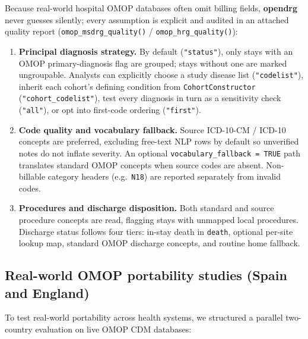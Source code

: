 \documentclass[fleqn,10pt]{IOMEDArticle}
\begin{document}
{\sloppy Because real-world hospital OMOP databases often omit billing fields, \textbf{opendrg} never guesses silently; every assumption is explicit and audited in an attached quality report (\texttt{omop\_\allowbreak msdrg\_\allowbreak quality()} / \texttt{omop\_\allowbreak hrg\_\allowbreak quality()}):
\begin{enumerate}[leftmargin=*,nosep]
    \item \textbf{Principal diagnosis strategy.} By default (\texttt{"status"}), only stays with an OMOP primary-diagnosis flag are grouped; stays without one are marked ungroupable. Analysts can explicitly choose a study disease list (\texttt{"codelist"}), inherit each cohort's defining condition from \texttt{CohortConstructor} (\texttt{"cohort\_\allowbreak codelist"}), test every diagnosis in turn as a sensitivity check (\texttt{"all"}), or opt into first-code ordering (\texttt{"first"}).
    \item \textbf{Code quality and vocabulary fallback.} Source ICD-10-CM / ICD-10 concepts are preferred, excluding free-text NLP rows by default so unverified notes do not inflate severity. An optional \texttt{vocabulary\_\allowbreak fallback = TRUE} path translates standard OMOP concepts when source codes are absent. Non-billable category headers (e.g.\ \texttt{N18}) are reported separately from invalid codes.
    \item \textbf{Procedures and discharge disposition.} Both standard and source procedure concepts are read, flagging stays with unmapped local procedures. Discharge status follows four tiers: in-stay death in \texttt{death}, optional per-site lookup map, standard OMOP discharge concepts, and routine home fallback.
\end{enumerate}
\par}

\subsection{Real-world OMOP portability studies (Spain and England)}

To test real-world portability across health systems, we structured a parallel two-country evaluation on live OMOP CDM databases:
\end{document}
